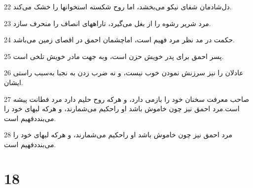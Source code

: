 \par 22 دل‌شادمان شفای نیکو می‌بخشد، اما روح شکسته استخوانها را خشک می‌کند.
\par 23 مرد شریر رشوه را از بغل می‌گیرد، تاراههای انصاف را منحرف سازد.
\par 24 حکمت در مد نظر مرد فهیم است، اماچشمان احمق در اقصای زمین می‌باشد.
\par 25 پسر احمق برای پدر خویش حزن است، وبه جهت مادر خویش تلخی است.
\par 26 عادلان را نیز سرزنش نمودن خوب نیست، و نه ضرب زدن به نجبا به‌سبب راستی ایشان.
\par 27 صاحب معرفت سخنان خود را بازمی دارد، و هر‌که روح حلیم دارد مرد فطانت پیشه است.مرد احمق نیز چون خاموش باشد او راحکیم می‌شمارند، و هر‌که لبهای خود را می‌بنددفهیم است.
\par 28 مرد احمق نیز چون خاموش باشد او راحکیم می‌شمارند، و هر‌که لبهای خود را می‌بنددفهیم است.
 
\chapter{18}

